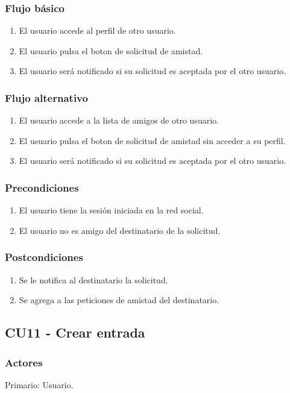 \documentclass[12pt, a4paper, titlepage]{article}
\begin{document}
\subsubsection{Flujo básico}
\begin{enumerate}
	\item El usuario accede al perfil de otro usuario.
	\item El usuario pulsa el boton de solicitud de amistad.
	\item El usuario será notificado si su solicitud es aceptada por el otro usuario.
\end{enumerate}
\subsubsection{Flujo alternativo}
\begin{enumerate}
	\item El usuario accede a la lista de amigos de otro usuario.
	\item El usuario pulsa el boton de solicitud de amistad sin acceder a su perfil.
	\item El usuario será notificado si su solicitud es aceptada por el otro usuario.
\end{enumerate}
\subsubsection{Precondiciones}
\begin{enumerate}
	\item El usuario tiene la sesión iniciada en la red social.
	\item El usuario no es amigo del destinatario de la solicitud.
\end{enumerate}
\subsubsection{Postcondiciones}
\begin{enumerate}
	\item Se le notifica al destinatario la solicitud.
	\item Se agrega a las peticiones de amistad del destinatario.
\end{enumerate}

\subsection{CU11 - Crear entrada}
\subsubsection{Actores}
Primario: Usuario.
\end{document}
